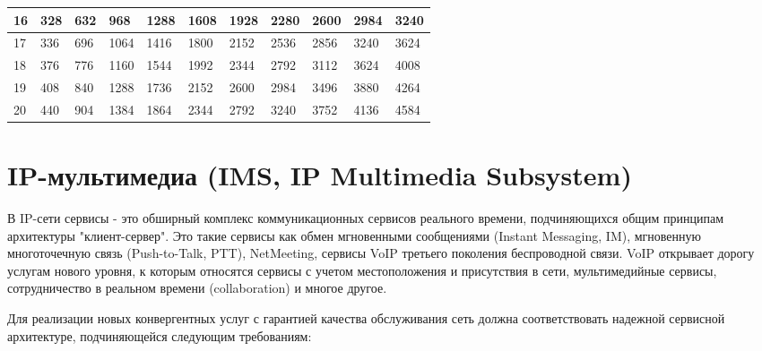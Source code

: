 \begin{table} [htb]
\begin{center}
\begin{tabular}{|l||l|l|l|l|l|l|l|l|l|l|}
    16   & 328 & 632 & 968  & 1288 & 1608 & 1928 & 2280 & 2600 & 2984 & 3240 \\ \hline
    17   & 336 & 696 & 1064 & 1416 & 1800 & 2152 & 2536 & 2856 & 3240 & 3624 \\ \hline
    18   & 376 & 776 & 1160 & 1544 & 1992 & 2344 & 2792 & 3112 & 3624 & 4008 \\ \hline
    19   & 408 & 840 & 1288 & 1736 & 2152 & 2600 & 2984 & 3496 & 3880 & 4264 \\ \hline
    20   & 440 & 904 & 1384 & 1864 & 2344 & 2792 & 3240 & 3752 & 4136 & 4584 \\ \hline    
    \end{tabular}
\end{center}
\end{table}






\section{IP-мультимедиа (IMS, IP Multimedia Subsystem)} \label{sect1_3}

В IP-сети сервисы - это обширный комплекс коммуникационных сервисов реального времени, подчиняющихся общим принципам архитектуры "клиент-сервер". Это такие сервисы как обмен мгновенными сообщениями (Instant Messaging, IM), мгновенную многоточечную связь (Push-to-Talk, PTT), NetMeeting, сервисы VoIP третьего поколения беспроводной связи. VoIP открывает дорогу услугам нового уровня, к которым относятся сервисы с учетом местоположения и присутствия в сети, мультимедийные сервисы, сотрудничество в реальном времени (collaboration) и многое другое.

Для реализации новых конвергентных услуг с гарантией качества обслуживания сеть должна соответствовать надежной сервисной архитектуре, подчиняющейся следующим требованиям:

